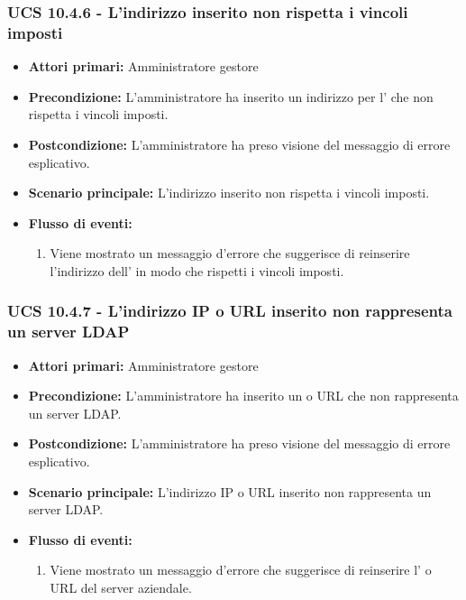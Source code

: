 \subsubsection{UCS 10.4.6 - L'indirizzo inserito non rispetta i vincoli imposti}%
\begin{itemize}
\item \textbf{Attori primari:} Amministratore gestore
\item \textbf{Precondizione:} L'amministratore ha inserito un indirizzo per l' che non rispetta i vincoli imposti.
\item \textbf{Postcondizione:} L'amministratore ha preso visione del messaggio di errore esplicativo.
\item \textbf{Scenario principale:} L'indirizzo inserito non rispetta i vincoli imposti.
\item \textbf{Flusso di eventi:}
    \begin{enumerate}
    \item Viene mostrato un messaggio d'errore che suggerisce di reinserire l'indirizzo dell' in modo che rispetti i vincoli imposti.
    \end{enumerate} 
\end{itemize}

\subsubsection{UCS 10.4.7 - L'indirizzo IP o URL inserito non rappresenta un server LDAP}%
\begin{itemize}
\item \textbf{Attori primari:} Amministratore gestore
\item \textbf{Precondizione:} L'amministratore ha inserito un  o URL che non rappresenta un server LDAP.
\item \textbf{Postcondizione:} L'amministratore ha preso visione del messaggio di errore esplicativo.
\item \textbf{Scenario principale:} L'indirizzo IP o URL inserito non rappresenta un server LDAP.
\item \textbf{Flusso di eventi:}
    \begin{enumerate}
    \item Viene mostrato un messaggio d'errore che suggerisce di reinserire l' o URL del server aziendale.
    \end{enumerate} 
\end{itemize}


